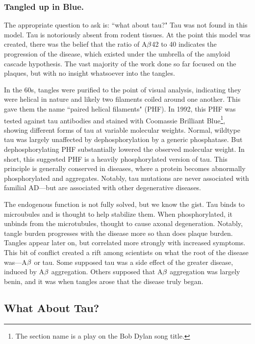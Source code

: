 \subsubsection*{Tangled up in Blue.}

The appropriate question to ask is: ``what about tau?" Tau was not found in this model. Tau is notoriously absent from rodent tissues. At the point this model was created, there was the belief that the ratio of A$\beta$42 to 40 indicates the progression of the disease, which existed under the umbrella of the amyloid cascade hypothesis. The vast majority of the work done so far focused on the plaques, but with no insight whatsoever into the tangles.\newline

 In the 60s, tangles were purified to the point of visual analysis, indicating they were helical in nature and likely two filaments coiled around one another. This gave them the name ``paired helical filaments" (PHF). In 1992, this PHF was tested against tau antibodies and stained with Coomassie Brilliant Blue\footnote{The section name is a play on the Bob Dylan song title.}, showing different forms of tau at variable molecular weights. Normal, wildtype tau was largely unaffected by dephosphorylation by a generic phosphatase. But dephosphorylating PHF substantially lowered the observed molecular weight. In short, this suggested PHF is a heavily phosphorylated version of tau. This principle is generally conserved in diseases, where a protein becomes abnormally phosphorylated and aggregates. Notably, tau mutations are never associated with familial AD---but are associated with other degenerative diseases.\newline

 The endogenous function is not fully solved, but we know the gist. Tau binds to microubules and is thought to help stabilize them. When phosphorylated, it unbinds from the microtubules, thought to cause axonal degeneration. Notably, tangle burden progresses with the disease more so than does plaque burden. Tangles appear later on, but correlated more strongly with increased symptoms. This bit of conflict created a rift among scientists on what the root of the disease was---A$\beta$ or tau. Some supposed tau was a side effect of the greater disease, induced by A$\beta$ aggregation. Others supposed that A$\beta$ aggregation was largely benin, and it was when tangles arose that the disease truly began. 

 \subsection*{What About Tau?}

